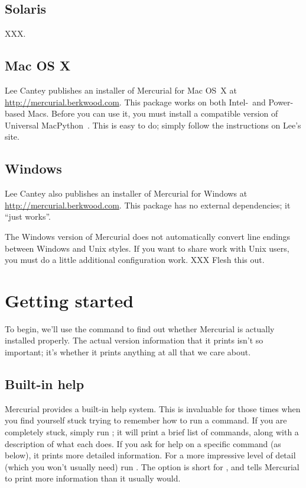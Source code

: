 \subsection{Solaris}

XXX.

\subsection{Mac OS X}

Lee Cantey publishes an installer of Mercurial for Mac OS~X at
\url{http://mercurial.berkwood.com}.  This package works on both
Intel-~and Power-based Macs.  Before you can use it, you must install
a compatible version of Universal MacPython~\cite{web:macpython}.  This
is easy to do; simply follow the instructions on Lee's site.

\subsection{Windows}

Lee Cantey also publishes an installer of Mercurial for Windows at
\url{http://mercurial.berkwood.com}.  This package has no external
dependencies; it ``just works''.

\begin{note}
  The Windows version of Mercurial does not automatically convert line
  endings between Windows and Unix styles.  If you want to share work
  with Unix users, you must do a little additional configuration
  work. XXX Flesh this out.
\end{note}

\section{Getting started}

To begin, we'll use the  command to find out whether
Mercurial is actually installed properly.  The actual version
information that it prints isn't so important; it's whether it prints
anything at all that we care about.

\subsection{Built-in help}

Mercurial provides a built-in help system.  This is invaluable for those
times when you find yourself stuck trying to remember how to run a
command.  If you are completely stuck, simply run ; it
will print a brief list of commands, along with a description of what
each does.  If you ask for help on a specific command (as below), it
prints more detailed information.
For a more impressive level of detail (which you won't usually need)
run .  The  option is short
for , and tells Mercurial to print more information
than it usually would.

